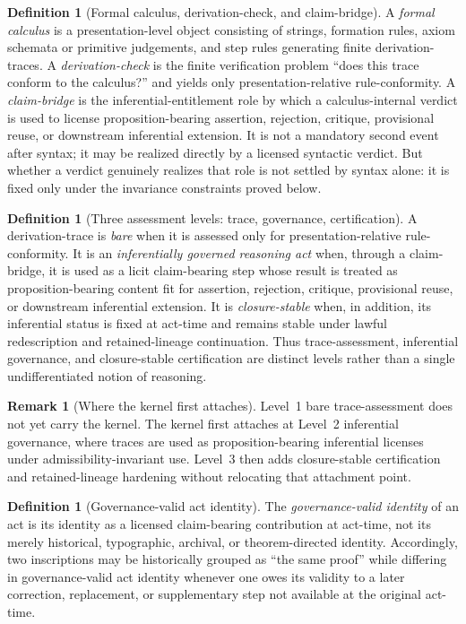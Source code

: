 \documentclass[11pt]{article}
\theoremstyle{plain}
\theoremstyle{definition}
\newtheorem{definition}[theorem]{Definition}
\newtheorem{remark}[theorem]{Remark}
\begin{document}
\begin{definition}[Formal calculus, derivation-check, and claim-bridge]
\label{def:A-formal-calculus}
A \emph{formal calculus} is a presentation-level object consisting of strings, formation rules, axiom schemata or primitive judgements, and step rules generating finite derivation-traces. A \emph{derivation-check} is the finite verification problem ``does this trace conform to the calculus?'' and yields only presentation-relative rule-conformity. A \emph{claim-bridge} is the inferential-entitlement role by which a calculus-internal verdict is used to license proposition-bearing assertion, rejection, critique, provisional reuse, or downstream inferential extension. It is not a mandatory second event after syntax; it may be realized directly by a licensed syntactic verdict. But whether a verdict genuinely realizes that role is not settled by syntax alone: it is fixed only under the invariance constraints proved below.
\end{definition}

\begin{definition}[Three assessment levels: trace, governance, certification]
\label{def:A-bare-trace}
A derivation-trace is \emph{bare} when it is assessed only for presentation-relative rule-conformity. It is an \emph{inferentially governed reasoning act} when, through a claim-bridge, it is used as a licit claim-bearing step whose result is treated as proposition-bearing content fit for assertion, rejection, critique, provisional reuse, or downstream inferential extension. It is \emph{closure-stable} when, in addition, its inferential status is fixed at act-time and remains stable under lawful redescription and retained-lineage continuation. Thus trace-assessment, inferential governance, and closure-stable certification are distinct levels rather than a single undifferentiated notion of reasoning.
\end{definition}



\begin{remark}[Where the kernel first attaches]
Level~1 bare trace-assessment does not yet carry the kernel. The kernel first attaches at Level~2 inferential governance, where traces are used as proposition-bearing inferential licenses under admissibility-invariant use. Level~3 then adds closure-stable certification and retained-lineage hardening without relocating that attachment point.
\end{remark}

\begin{definition}[Governance-valid act identity]
\label{def:A-act-identity}
The \emph{governance-valid identity} of an act is its identity as a licensed claim-bearing contribution at act-time, not its merely historical, typographic, archival, or theorem-directed identity. Accordingly, two inscriptions may be historically grouped as ``the same proof'' while differing in governance-valid act identity whenever one owes its validity to a later correction, replacement, or supplementary step not available at the original act-time.
\end{definition}
\end{document}

